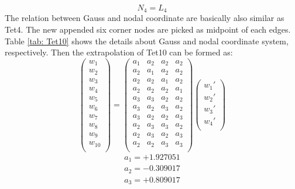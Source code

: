 \begin{equation}
N_4 = L_4
\end{equation}
The relation between Gauss and nodal coordinate are basically also similar as Tet4.  The new appended six corner nodes are picked as midpoint of each edges. Table \ref{tab: Tet10} shows the details about Gauss and nodal coordinate system, respectively. Then the extrapolation of Tet10 can be formed as:
\begin{equation}
\begin{pmatrix}
w_1 \\
w_2 \\
w_3 \\
w_4 \\
w_5 \\
w_6 \\
w_7 \\
w_8 \\
w_9 \\
w_{10} \\
\end{pmatrix} = \begin{pmatrix}
a_1 & a_2 &  a_2 &  a_2      \\[0.3em]
a_2 & a_1 &  a_2 &  a_2      \\[0.3em]
a_2 & a_2 &  a_1 &  a_2      \\[0.3em]
a_2 & a_2 &  a_2 &  a_1      \\[0.3em]
a_3 & a_3 &  a_2 &  a_2      \\[0.3em]
a_3 & a_2 &  a_3 &  a_2      \\[0.3em]
a_3 & a_2 &  a_2 &  a_3      \\[0.3em]
a_2 & a_3 &  a_3 &  a_2      \\[0.3em]
a_2 & a_3 &  a_2 &  a_3      \\[0.3em]
a_2 & a_2 &  a_3 &  a_3      \\[0.3em]
\end{pmatrix} \begin{pmatrix}
{w_1}' \\
{w_2}' \\
{w_3}' \\
{w_4}' \\
\end{pmatrix}
\end{equation}	
\begin{align*}
a_1 = +1.927051 \\
a_2 = -0.309017 \\
a_3 = +0.809017
\end{align*}




